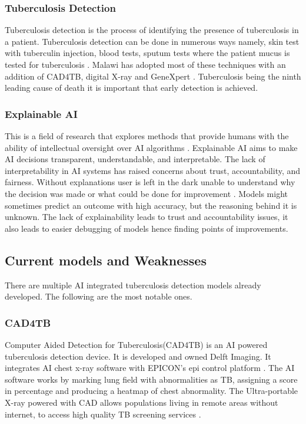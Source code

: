 \documentclass[12pt,a4paper]{article}
\begin{document}
\subsubsection{Tuberculosis Detection}
Tuberculosis detection is the process of identifying the presence of tuberculosis in a patient. Tuberculosis detection can be done in numerous ways namely, skin test with tuberculin injection, blood tests, sputum tests where the patient mucus is tested for tuberculosis \citep{Mayo-clinic}. Malawi has adopted most of these techniques with an addition of CAD4TB, digital X-ray and GeneXpert \citep{KUHES2024}. Tuberculosis being the ninth leading cause of death it is important that early detection is achieved. 

\subsubsection{Explainable AI}
This is a field of research that explores methods that provide humans with the ability of intellectual oversight over AI algorithms \citep{Ribeiro2016}.
Explainable AI aims to make AI decisions transparent, understandable, and interpretable. The
lack of interpretability in AI systems has raised concerns about trust, accountability, and fairness. Without explanations user is left in the dark unable to understand why the decision was made or what could be done for improvement \citep{Alharthi2024}. Models might sometimes predict an outcome with high accuracy, but the reasoning behind it is unknown. The lack of explainability leads to trust and accountability issues, it also leads to easier debugging of models hence finding points of improvements.

\subsection{Current models and Weaknesses}
There are multiple AI integrated tuberculosis detection models already developed. The following are the most notable ones.

\subsubsection{CAD4TB}

Computer Aided Detection for Tuberculosis(CAD4TB) is an AI powered tuberculosis detection device. It is developed and owned Delft Imaging. It integrates AI chest x-ray software with EPICON's epi control platform \citep{Delft-Imaging2025}.
The AI software works by marking lung field with abnormalities as TB, assigning a score in percentage and producing a heatmap of chest abnormality. The Ultra-portable X-ray powered with CAD allows populations living in remote areas without internet, to access high quality TB screening services \citep{CheckTB2025}. 
\end{document}
